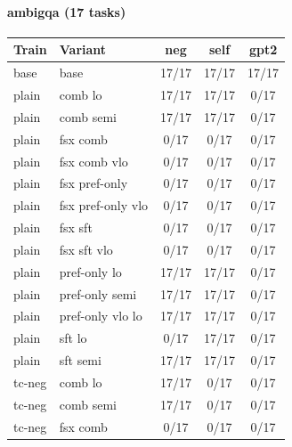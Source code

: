 \documentclass[10pt,landscape]{article}
\begin{document}
\paragraph{ambigqa (17 tasks)}
\begin{tabular}{llccc}
\toprule
Train & Variant & neg & self & gpt2 \\
\midrule
base & base & \cellcolor{done}17/17 & \cellcolor{done}17/17 & \cellcolor{done}17/17 \\
plain & comb lo & \cellcolor{done}17/17 & \cellcolor{done}17/17 & \cellcolor{missing}0/17 \\
plain & comb semi & \cellcolor{done}17/17 & \cellcolor{done}17/17 & \cellcolor{missing}0/17 \\
plain & fsx comb & \cellcolor{missing}0/17 & \cellcolor{missing}0/17 & \cellcolor{missing}0/17 \\
plain & fsx comb vlo & \cellcolor{missing}0/17 & \cellcolor{missing}0/17 & \cellcolor{missing}0/17 \\
plain & fsx pref-only & \cellcolor{missing}0/17 & \cellcolor{missing}0/17 & \cellcolor{missing}0/17 \\
plain & fsx pref-only vlo & \cellcolor{missing}0/17 & \cellcolor{missing}0/17 & \cellcolor{missing}0/17 \\
plain & fsx sft & \cellcolor{missing}0/17 & \cellcolor{missing}0/17 & \cellcolor{missing}0/17 \\
plain & fsx sft vlo & \cellcolor{missing}0/17 & \cellcolor{missing}0/17 & \cellcolor{missing}0/17 \\
plain & pref-only lo & \cellcolor{done}17/17 & \cellcolor{done}17/17 & \cellcolor{missing}0/17 \\
plain & pref-only semi & \cellcolor{done}17/17 & \cellcolor{done}17/17 & \cellcolor{missing}0/17 \\
plain & pref-only vlo lo & \cellcolor{done}17/17 & \cellcolor{done}17/17 & \cellcolor{missing}0/17 \\
plain & sft lo & \cellcolor{missing}0/17 & \cellcolor{done}17/17 & \cellcolor{missing}0/17 \\
plain & sft semi & \cellcolor{done}17/17 & \cellcolor{done}17/17 & \cellcolor{missing}0/17 \\
tc-neg & comb lo & \cellcolor{done}17/17 & \cellcolor{missing}0/17 & \cellcolor{missing}0/17 \\
tc-neg & comb semi & \cellcolor{done}17/17 & \cellcolor{missing}0/17 & \cellcolor{missing}0/17 \\
tc-neg & fsx comb & \cellcolor{missing}0/17 & \cellcolor{missing}0/17 & \cellcolor{missing}0/17 \\

\end{tabular}
\end{document}
